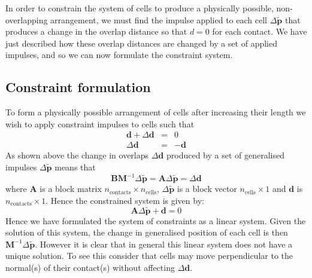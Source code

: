 \documentclass{report}
\renewcommand{\vec}[1]{\mathbf{#1}}
\newcommand{\mat}{\mathbf}
\newcommand{\invmat}[1]{\mat{#1}^{-1}}
\newcommand{\Minv}{\mat{M}^{-1}}
\begin{document}
In order to constrain the system of cells to produce
a physically possible, non-overlapping arrangement, we must find the 
impulse applied to each cell $\Delta \tilde{\vec{p}}$ that produces a change in
the overlap distance so that $d=0$ for each contact. 
We have just described how these overlap distances are changed by a set of
applied impulses, and so we can now formulate the constraint system.

\subsection{Constraint formulation}
To form a physically possible arrangement of cells after increasing their length
we wish to apply constraint impulses to cells such that
\begin{eqnarray*}
\vec{d} + \Delta \vec{d} &=& 0\\
\Delta \vec{d} &=& -\vec{d}
\end{eqnarray*}
As shown above the change in overlaps $\Delta \vec{d}$ produced by a set of
generalised impulses $\Delta \tilde{\vec{p}}$ means that
\[
\mat{B}\invmat{M}\Delta\tilde{\vec{p}} = \mat{A}\Delta\tilde{\vec{p}} = \Delta
\vec{d}
\]
where $\mat{A}$ is a block matrix $n_{\textrm{contacts}} \times
n_{\textrm{cells}}$, $\Delta\tilde{\vec{p}}$ is a block vector $n_{\textrm{cells}} \times 1$ and
$\vec{d}$ is  $n_{\textrm{contacts}}\times 1$. Hence the constrained system is
given by:
\[
\mat{A}\Delta\tilde{\vec{p}} + \vec{d} = 0
\]
Hence we have formulated the system of constraints as a linear system. Given the
solution of this system, the change in generalised position of each cell is then $\Minv \Delta\tilde{\vec{p}}$.
However it is clear that in general this linear system does not have a unique solution.
To see this consider that cells may move perpendicular to the normal(s) of their
contact(s) without affecting $\Delta \vec{d}$.
\end{document}

